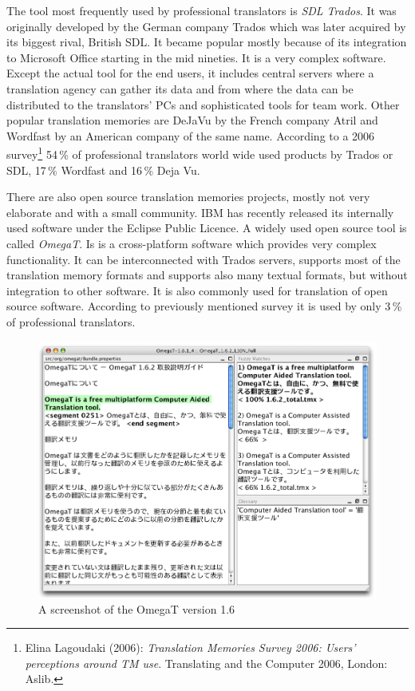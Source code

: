 The tool most frequently used by professional translators is \emph{SDL Trados}. It was originally developed by the German company Trados which was later acquired by its biggest rival, British SDL. It became popular mostly because of its integration to Microsoft Office starting in the mid nineties. It is a very complex software. Except the actual tool for the end users, it includes central servers where a translation agency can gather its data and from where the data can be distributed to the translators' PCs and sophisticated tools for team work. Other popular translation memories are DeJaVu by the French company Atril and Wordfast by an American company of the same name. According to a 2006 survey\footnote{Elina Lagoudaki (2006): \emph{Translation Memories Survey 2006: Users' perceptions around TM use}. Translating and the Computer 2006, London: Aslib.} 54\,\% of professional translators world wide used products by Trados or SDL, 17\,\% Wordfast and 16\,\% Deja Vu.

There are also open source translation memories projects, mostly not very elaborate and with a small community. IBM has recently released its internally used software under the Eclipse Public Licence. A widely used open source tool is called \emph{OmegaT}. Is is a cross-platform software which provides very complex functionality. It can be interconnected with Trados servers, supports most of the translation memory formats and supports also many textual formats, but without integration to other software. It is also commonly used for translation of open source software. According to previously mentioned survey it is used by only 3\,\% of professional translators.

\begin{figure}
\begin{center}
\includegraphics[scale=.4]{./figures/omegat.png}
\end{center}

\caption{A screenshot of the OmegaT version 1.6}

\end{figure}

